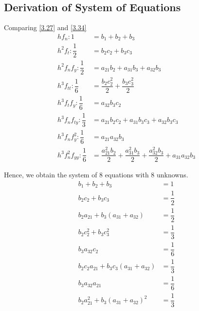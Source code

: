 \documentclass[a4paper,oneside]{book}
\numberwithin{equation}{chapter}
\begin{document}
\subsection{Derivation of System of Equations}
Comparing \eqref{3.27} and \eqref{3.34}
\begin{align}
h{f_n}:1 &= {b_1} + {b_2} + {b_3}\\
{h^2}{f_t}:\dfrac{1}{2} &= {b_2}{c_2} + {b_3}{c_3}\\
{h^2}{f_n}{f_y}:\dfrac{1}{2} &= {a_{21}}{b_2} + {a_{31}}{b_3} + {a_{32}}{b_3}\\
{h^3}{f_{tt}}:\dfrac{1}{6} &= \dfrac{{{b_2}c_2^2}}{2} + \dfrac{{{b_3}c_3^2}}{2}\\
{h^3}{f_t}{f_y}:\dfrac{1}{6} &= {a_{32}}{b_3}{c_2}\\
{h^3}{f_n}{f_{ty}}:\dfrac{1}{3} &= {a_{21}}{b_2}{c_2} + {a_{31}}{b_3}{c_3} + {a_{32}}{b_3}{c_3}\\
{h^3}{f_n}f_y^2:\dfrac{1}{6} &= {a_{21}}{a_{32}}{b_3}\\
{h^3}f_n^2{f_{yy}}:\dfrac{1}{6} &= \dfrac{{a_{21}^2{b_2}}}{2} + \dfrac{{a_{31}^2{b_3}}}{2} + \dfrac{{a_{32}^2{b_3}}}{2} + {a_{31}}{a_{32}}{b_3}
\end{align}

Hence, we obtain the system of 8 equations with 8 unknowns.
\begin{align}
{b_1} + {b_2} + {b_3} &= 1\label{3.45}\\
{b_2}{c_2} + {b_3}{c_3} &= \dfrac{1}{2}\\
{b_2}{a_{21}} + {b_3}\left( {{a_{31}} + {a_{32}}} \right) &= \dfrac{1}{2}\\
{b_2}c_2^2 + {b_3}c_3^2 &= \dfrac{1}{3}\\
{b_3}{a_{32}}{c_2} &= \dfrac{1}{6}\label{3.49}\\
{b_2}{c_2}{a_{21}} + {b_3}{c_3}\left( {{a_{31}} + {a_{32}}} \right)& = \dfrac{1}{3}\\
{b_3}{a_{32}}{a_{21}} &= \dfrac{1}{6}\label{3.51}\\
{b_2}a_{21}^2 + {b_3}{\left( {{a_{31}} + {a_{32}}} \right)^2} &= \dfrac{1}{3}\label{3.52}
\end{align}
\end{document}
